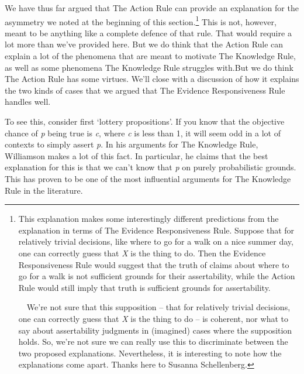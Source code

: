 We have thus far argued that The Action Rule can provide an explanation for the asymmetry we noted at the beginning of this section.\footnote{This explanation makes some interestingly different predictions from the explanation in terms of The Evidence Responsiveness Rule. Suppose that for relatively trivial decisions, like where to go for a walk on a nice summer day, one can correctly guess that \textit{X} is the thing to do. Then the Evidence Responsiveness Rule would suggest that the truth of claims about where to go for a walk is not sufficient grounds for their assertability, while the Action Rule would still imply that truth is sufficient grounds for assertability. \par \ \ We're not sure that this supposition -- that for relatively trivial decisions, one can correctly guess that \textit{X} is the thing to do -- is coherent, nor what to say about assertability judgments in (imagined) cases where the supposition holds. So, we're not sure we can really use this to discriminate between the two proposed explanations. Nevertheless, it is interesting to note how the explanations come apart. Thanks here to Susanna Schellenberg.} This is not, however, meant to be anything like a complete defence of that rule. That would require a lot more than we've provided here. But we do think that the Action Rule can explain a lot of the phenomena that are meant to motivate The Knowledge Rule, as well as some phenomena The Knowledge Rule struggles with.But we do think The Action Rule has some virtues. We'll close with a discussion of how it explains the two kinds of cases that we argued that The Evidence Responsiveness Rule handles well.

To see this, consider first `lottery propositions'. If you know that the objective chance of \textit{p} being true is \textit{c}, where \textit{c} is less than 1, it will seem odd in a lot of contexts to simply assert \textit{p}. In his arguments for The Knowledge Rule, Williamson makes a lot of this fact. In particular, he claims that the best explanation for this is that we can't know that \textit{p} on purely probabilistic grounds. This has proven to be one of the most influential arguments for The Knowledge Rule in the literature.  

